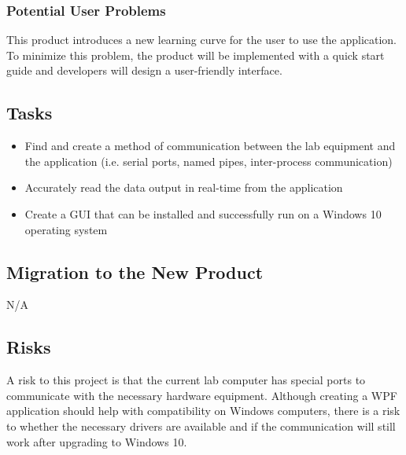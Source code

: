 \documentclass[12pt, titlepage]{article}
\begin{document}
  \subsubsection{Potential User Problems}
This product introduces a new learning curve for the user to use the application. 
To minimize this problem, the product will be implemented with a quick start guide and developers will design a user-friendly interface.


\subsection{Tasks}
\begin{itemize}
  \item Find and create a method of communication between the lab equipment and the application (i.e. serial ports, named pipes, inter-process communication)
  \item Accurately read the data output in real-time from the application
  \item Create a GUI that can be installed and successfully run on a Windows 10 operating system
\end{itemize}

\subsection{Migration to the New Product}
N/A

\subsection{Risks}
A risk to this project is that the current lab computer has special ports to communicate with the necessary hardware equipment. Although creating a WPF application should help with compatibility on Windows computers,
there is a risk to whether the necessary drivers are available and if the communication will still work after upgrading to Windows 10. \\
\end{document}
